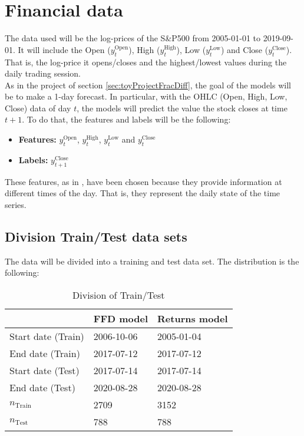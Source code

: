 \documentclass[a4paper]{report}
\begin{document}
\section{Financial data}
\label{sec:fracDiffFinData}
The data used will be the log-prices of the S\&P500 from 2005-01-01 to 
2019-09-01. It will include the Open ($y_t^{\text{Open}}$), High 
($y_t^{\text{High}}$), Low ($y_t^{\text{Low}}$) and Close 
($y_t^{\text{Close}}$). That is, the log-price it opens/closes and the 
highest/lowest values during the daily trading session.\\

As in the project of section \ref{sec:toyProjectFracDiff}, the goal of the 
models will be to make a 1-day forecast. In particular, with the OHLC (Open, 
High, Low, Close) data of day $t$, the models will predict the value the 
stock closes at time $t + 1$. To do that, the features and labels 
will be the following:

\begin{itemize}
	\item \textbf{Features:} $y_t^{\text{Open}}$, $y_t^{\text{High}}$, 
	$y_t^{\text{Low}}$ and $y_t^{\text{Close}}$
	\item \textbf{Labels:} $y_{t + 1}^{\text{Close}}$
\end{itemize}

These features, as in \cite{gajda2020fractional}, have been chosen because 
they provide information at different times of the day. That is, they 
represent the daily state of the time series.

\subsection{Division Train/Test data sets}
The data will be divided into a training and test data set. The distribution 
is the following:

\begin{table}[htbp]
	\centering
	\caption{Division of Train/Test}
	\label{tab:trainTestFracDiff}
	\vspace{.1cm}
	\begin{tabular}{ |C{3.5cm}|C{2.5cm}|C{2.5cm}| }
		\hline
			 				& FFD model & Returns model\\
		\hline
		Start date (Train)	& 2006-10-06 & 2005-01-04\\
		End date (Train)		& 2017-07-12 & 2017-07-12\\
		\hline
		Start date (Test)	& 2017-07-14 & 2017-07-14\\
		End date (Test)		& 2020-08-28 & 2020-08-28\\
		\hline
		$n_{\text{Train}}$	& 2709 		 & 3152\\
		$n_{\text{Test}}$	& 788  		 & 788\\		
		\hline
	\end{tabular}
\end{table}
\end{document}
